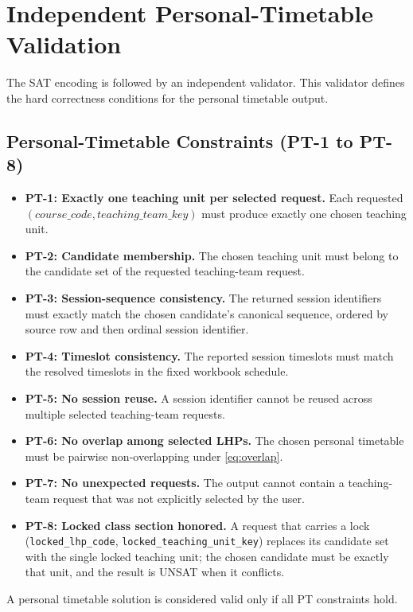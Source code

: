 \documentclass{article}
\begin{document}
\section{Independent Personal-Timetable Validation}

The SAT encoding is followed by an independent validator. This validator defines the hard correctness conditions for the personal timetable output.

\subsection{Personal-Timetable Constraints (PT-1 to PT-8)}
\begin{itemize}
    \item \textbf{PT-1: Exactly one teaching unit per selected request.} Each requested $(course\_code, teaching\_team\_key)$ must produce exactly one chosen teaching unit.
    \item \textbf{PT-2: Candidate membership.} The chosen teaching unit must belong to the candidate set of the requested teaching-team request.
    \item \textbf{PT-3: Session-sequence consistency.} The returned session identifiers must exactly match the chosen candidate's canonical sequence, ordered by source row and then ordinal session identifier.
    \item \textbf{PT-4: Timeslot consistency.} The reported session timeslots must match the resolved timeslots in the fixed workbook schedule.
    \item \textbf{PT-5: No session reuse.} A session identifier cannot be reused across multiple selected teaching-team requests.
    \item \textbf{PT-6: No overlap among selected LHPs.} The chosen personal timetable must be pairwise non-overlapping under \eqref{eq:overlap}.
    \item \textbf{PT-7: No unexpected requests.} The output cannot contain a teaching-team request that was not explicitly selected by the user.
    \item \textbf{PT-8: Locked class section honored.} A request that carries a lock (\texttt{locked\_lhp\_code}, \texttt{locked\_teaching\_unit\_key}) replaces its candidate set with the single locked teaching unit; the chosen candidate must be exactly that unit, and the result is UNSAT when it conflicts.
\end{itemize}

A personal timetable solution is considered valid only if all PT constraints hold.
\end{document}
